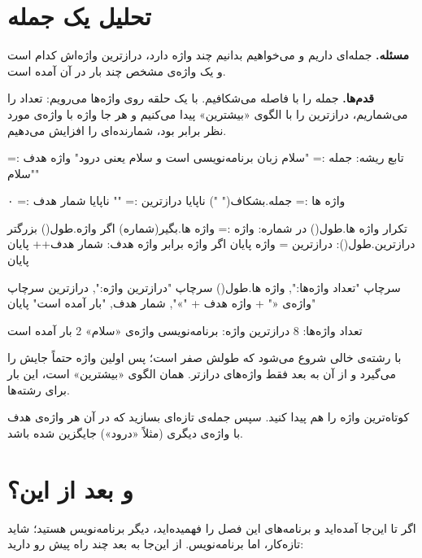 \section{تحلیل یک جمله}

\textbf{مسئله.} جمله‌ای داریم و می‌خواهیم بدانیم چند واژه دارد، درازترین
واژه‌اش کدام است و یک واژه‌ی مشخص چند بار در آن آمده است.

\textbf{قدم‌ها.} جمله را با فاصله می‌شکافیم. با یک حلقه روی واژه‌ها
می‌رویم: تعداد را می‌شماریم، درازترین را با الگوی «بیشترین» پیدا می‌کنیم و
هر جا واژه با واژه‌ی مورد نظر برابر بود، شمارنده‌ای را افزایش می‌دهیم.

\begin{salamfa}
تابع ریشه:
    جمله := "سلام زبان برنامه‌نویسی است و سلام یعنی درود"
    واژه هدف := "سلام"

    واژه ها := جمله.بشکاف(" ")
    ناپایا درازترین := ""
    ناپایا شمار هدف := ۰

    تکرار واژه ها.طول() در شماره:
        واژه := واژه ها.بگیر(شماره)
        اگر واژه.طول() بزرگتر درازترین.طول():
            درازترین = واژه
        پایان
        اگر واژه برابر واژه هدف:
            شمار هدف++
        پایان
    پایان

    سرچاپ "تعداد واژه‌ها:", واژه ها.طول()
    سرچاپ "درازترین واژه:", درازترین
    سرچاپ "واژه‌ی «" + واژه هدف + "»", شمار هدف, "بار آمده است"
پایان
\end{salamfa}

\begin{outputfa}
تعداد واژه‌ها: 8
درازترین واژه: برنامه‌نویسی
واژه‌ی «سلام» 2 بار آمده است
\end{outputfa}

 با رشته‌ی خالی شروع می‌شود که طولش صفر است؛ پس اولین
واژه حتماً جایش را می‌گیرد و از آن به بعد فقط واژه‌های درازتر. همان الگوی
«بیشترین» است، این بار برای رشته‌ها.

\begin{tip}
کوتاه‌ترین واژه را هم پیدا کنید. سپس جمله‌ی تازه‌ای بسازید که در آن هر
واژه‌ی هدف با واژه‌ی دیگری (مثلاً «درود») جایگزین شده باشد.
\end{tip}

\section{و بعد از این؟}

اگر تا این‌جا آمده‌اید و برنامه‌های این فصل را فهمیده‌اید، دیگر
برنامه‌نویس هستید؛ شاید تازه‌کار، اما برنامه‌نویس. از این‌جا به بعد چند
راه پیش رو دارید:

